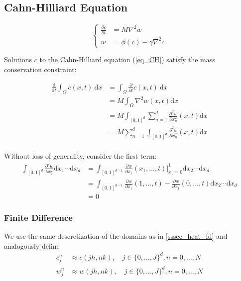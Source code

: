 \documentclass[12pt, reqno]{article}
\theoremstyle{definition}
\theoremstyle{remark}
\newcommand{\ud}{\mathrm{d}}
\begin{document}
\subsection{Cahn-Hilliard Equation} \label{ssec_CH}

\begin{equation} \label{eq_CH}
    \left\{
        \begin{split}
            \frac{\partial c}{\partial t} &=M\nabla^2w\\
            w&=\phi(c)-\gamma\nabla^2c
        \end{split}
    \right.
\end{equation}


Solutions $c$ to the Cahn-Hilliard equation (\ref{eq_CH}) satisfy the mass conservation constraint:

\begin{align*}
    \frac{\ud}{\ud t}\int_{\Omega} c(x,t)~\ud x&=\int_{\Omega} \frac{\partial}{\partial t}c(x,t)~\ud x\\
    &= M\int_{\Omega}\nabla^{2}w(x,t)\ud x\\
    &= M\int_{[0,1]^{d}}\sum_{n=1}^{d}\frac{\partial ^{2}w}{\partial x_{n}^{2}}(x,t)\ud x\\
    &= M\sum_{n=1}^{d}\int_{[0,1]^{d}}\frac{\partial ^{2}w}{\partial x_{n}^{2}}(x,t)\ud x\\
\end{align*}

Without loss of generality, consider the first term:
\begin{align*}
    \int_{[0,1]^{d}}\frac{\partial ^{2}w}{\partial x_{1}^{2}}\ud x_{1}\cdots \ud x_{d}&= \int_{[0,1]^{d-1}} \frac{\partial w}{\partial x_{1}}(x_{1},\dots,t)\bigg|_{x_{1}=0}^{1}\ud x_{2}\cdots \ud x_{d}\\
    &= \int_{[0,1]^{d-1}}\frac{\partial w}{\partial x_{1}}(1,\ldots,t)-\frac{\partial w}{\partial x_{1}}(0,\ldots,t)\ud x_{2}\cdots\ud x_{d}\\
    &= 0
\end{align*}


\subsubsection{Finite Difference} \label{sssec_CH_FD}

We use the same descretization of the domains as in \ref{sssec_heat_fd} and analogously define 
\begin{align*}
	c_j^n&\approx c(jh,nk),\quad j\in\{0,\ldots,J\}^d,n=0,\ldots,N\\
	w_j^n&\approx w(jh,nk),\quad j\in\{0,\ldots,J\}^d,n=0,\ldots,N
\end{align*}
\end{document}
